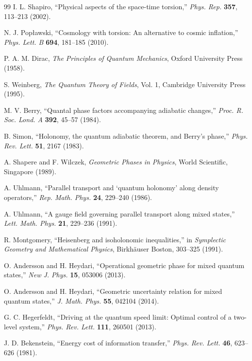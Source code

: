 \documentclass[11pt, a4paper]{article}
\begin{document}
\begin{thebibliography}{99}
I. L. Shapiro, ``Physical aspects of the space-time torsion,'' \textit{Phys. Rep.} \textbf{357}, 113--213 (2002).

N. J. Pop{\l}awski, ``Cosmology with torsion: An alternative to cosmic inflation,'' \textit{Phys. Lett. B} \textbf{694}, 181--185 (2010).

P. A. M. Dirac, \textit{The Principles of Quantum Mechanics}, Oxford University Press (1958).

S. Weinberg, \textit{The Quantum Theory of Fields}, Vol. 1, Cambridge University Press (1995).

M. V. Berry, ``Quantal phase factors accompanying adiabatic changes,'' \textit{Proc. R. Soc. Lond. A} \textbf{392}, 45--57 (1984).

B. Simon, ``Holonomy, the quantum adiabatic theorem, and Berry's phase,'' \textit{Phys. Rev. Lett.} \textbf{51}, 2167 (1983).

A. Shapere and F. Wilczek, \textit{Geometric Phases in Physics}, World Scientific, Singapore (1989).

A. Uhlmann, ``Parallel transport and `quantum holonomy' along density operators,'' \textit{Rep. Math. Phys.} \textbf{24}, 229--240 (1986).

A. Uhlmann, ``A gauge field governing parallel transport along mixed states,'' \textit{Lett. Math. Phys.} \textbf{21}, 229--236 (1991).

R. Montgomery, ``Heisenberg and isoholonomic inequalities,'' in \textit{Symplectic Geometry and Mathematical Physics}, Birkh\"auser Boston, 303--325 (1991).

O. Andersson and H. Heydari, ``Operational geometric phase for mixed quantum states,'' \textit{New J. Phys.} \textbf{15}, 053006 (2013).

O. Andersson and H. Heydari, ``Geometric uncertainty relation for mixed quantum states,'' \textit{J. Math. Phys.} \textbf{55}, 042104 (2014).

G. C. Hegerfeldt, ``Driving at the quantum speed limit: Optimal control of a two-level system,'' \textit{Phys. Rev. Lett.} \textbf{111}, 260501 (2013).

J. D. Bekenstein, ``Energy cost of information transfer,'' \textit{Phys. Rev. Lett.} \textbf{46}, 623--626 (1981).

\end{thebibliography}
\end{document}

